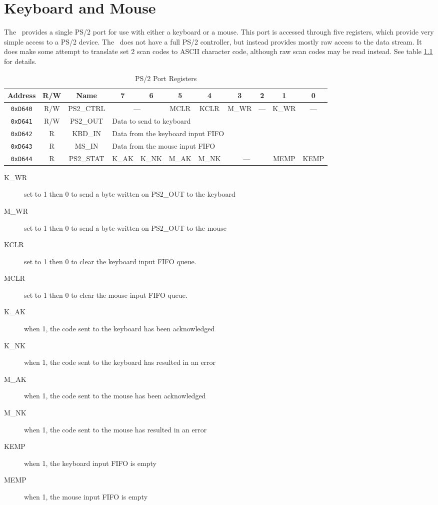 \chapter{Keyboard and Mouse}

The \jr\ provides a single PS/2 port for use with either a keyboard or a mouse. This port is accessed through five registers, which provide very simple access to a PS/2 device. The \jr\ does not have a full PS/2 controller, but instead provides mostly raw access to the data stream. It does make some attempt to translate set 2 scan codes to ASCII character code, although raw scan codes may be read instead. See table \ref{tab:ps2_reg} for details.

\begin{table}[ht]
    \begin{center}
        \begin{tabular}{|c|c|c|c|c|c|c|c|c|c|c|} \hline
            Address & R/W & Name & 7 & 6 & 5 & 4 & 3 & 2 & 1 & 0 \\\hline\hline
            \verb+0xD640+ & R/W & PS2\_CTRL & \multicolumn{2}{|c|}{---} & MCLR & KCLR & M\_WR & --- & K\_WR & --- \\\hline
            \verb+0xD641+ & R/W & PS2\_OUT & \multicolumn{8}{|l|}{Data to send to keyboard} \\ \hline
            \verb+0xD642+ & R & KBD\_IN & \multicolumn{8}{|l|}{Data from the keyboard input FIFO} \\ \hline
            \verb+0xD643+ & R & MS\_IN & \multicolumn{8}{|l|}{Data from the mouse input FIFO} \\ \hline
            \verb+0xD644+ & R & PS2\_STAT & K\_AK & K\_NK & M\_AK & M\_NK & \multicolumn{2}{|c|}{---} & MEMP & KEMP \\ \hline
        \end{tabular}
    \end{center}
    \caption{PS/2 Port Registers}
    \label{tab:ps2_reg}
\end{table}

\begin{description}
    \item[K\_WR] set to 1 then 0 to send a byte written on PS2\_OUT to the keyboard
    \item[M\_WR] set to 1 then 0 to send a byte written on PS2\_OUT to the mouse
    \item[KCLR] set to 1 then 0 to clear the keyboard input FIFO queue.
    \item[MCLR] set to 1 then 0 to clear the mouse input FIFO queue. 
    \item[K\_AK] when 1, the code sent to the keyboard has been acknowledged
    \item[K\_NK] when 1, the code sent to the keyboard has resulted in an error
    \item[M\_AK] when 1, the code sent to the mouse has been acknowledged
    \item[M\_NK] when 1, the code sent to the mouse has resulted in an error
    \item[KEMP] when 1, the keyboard input FIFO is empty
    \item[MEMP] when 1, the mouse input FIFO is empty 
\end{description}

